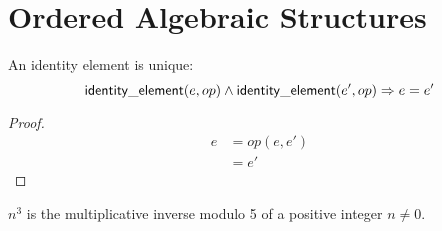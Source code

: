 \chapter{Ordered Algebraic Structures}

\begin{lemma}
	An identity element is unique:
	\[ \mathsf{identity\_element}(e, op) \wedge \mathsf{identity\_element}(e', op) \Rightarrow e = e' \]
\end{lemma}

\begin{proof}
	\begin{align*}
		e &= op(e, e')\\
		  &= e'
	\end{align*}
\end{proof}

\begin{lemma}
	$n^3$ is the multiplicative inverse modulo 5 of a positive integer $n \neq 0$.
\end{lemma}
